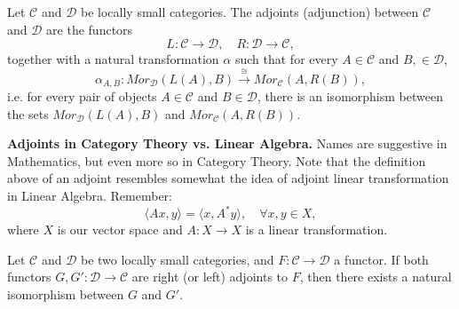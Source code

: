 \begin{definition}
  Let $\mathcal C$ and $\mathcal D$ be locally small categories. The adjoints (adjunction) between
  $\mathcal C$ and $\mathcal D$ are the functors
  \begin{displaymath}
    L:\mathcal C \to \mathcal D, \quad R:\mathcal D \to \mathcal C,
  \end{displaymath}
  together with a natural transformation $\alpha$ such that for every
  $A \in \mathcal C$ and $B, \in \mathcal D$,
  \begin{displaymath}
    \alpha_{A,B}: Mor_\mathcal D (L(A), B) \overset{\cong}{\longrightarrow} Mor_\mathcal C (A, R(B)),
  \end{displaymath}
  i.e. for every pair of objects $A \in \mathcal C$  and $B \in \mathcal D$, there is an isomorphism
  between the sets $Mor_\mathcal D(L(A), B)$ and $Mor_\mathcal C (A, R(B))$.
\end{definition}

\begin{shaded}
  \textbf{Adjoints in Category Theory vs. Linear Algebra.} Names are suggestive in Mathematics,
  but even more so in Category Theory. Note that the definition above of an adjoint resembles
  somewhat the idea of adjoint linear transformation in Linear Algebra. Remember:
  \begin{displaymath}
    \langle A x, y \rangle  = \langle x, A^* y \rangle, \quad \forall x,y \in X,
  \end{displaymath}
  where $X$ is our vector space and $A: X \to X$ is a linear transformation.
\end{shaded}

\begin{proposition}
  Let $\mathcal C$ and $\mathcal D$ be two locally small categories, and $F:\mathcal C \to \mathcal D$
  a functor. If both functors $G,G':\mathcal D \to \mathcal C$ are right (or left) adjoints
  to $F$, then there exists a natural isomorphism between $G$ and $G'$.
\end{proposition}
